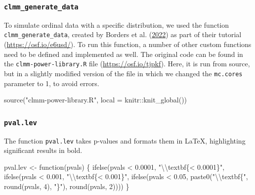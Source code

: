 \documentclass[
  bookmarksnumbered]{article}
\newenvironment{Shaded}{\begin{snugshade}}{\end{snugshade}}
\newcommand{\AttributeTok}[1]{\textcolor[rgb]{0.80,0.80,0.80}{#1}}
\newcommand{\ControlFlowTok}[1]{\textcolor[rgb]{0.94,0.87,0.69}{#1}}
\newcommand{\DecValTok}[1]{\textcolor[rgb]{0.86,0.86,0.80}{#1}}
\newcommand{\FloatTok}[1]{\textcolor[rgb]{0.75,0.75,0.82}{#1}}
\newcommand{\FunctionTok}[1]{\textcolor[rgb]{0.94,0.94,0.56}{#1}}
\newcommand{\NormalTok}[1]{\textcolor[rgb]{0.80,0.80,0.80}{#1}}
\newcommand{\OtherTok}[1]{\textcolor[rgb]{0.94,0.94,0.56}{#1}}
\newcommand{\SpecialCharTok}[1]{\textcolor[rgb]{0.86,0.64,0.64}{#1}}
\newcommand{\StringTok}[1]{\textcolor[rgb]{0.80,0.58,0.58}{#1}}
\begin{document}
\hypertarget{clmm_generate_data}{%
\subsubsection{\texorpdfstring{\texttt{clmm\_generate\_data}}{clmm\_generate\_data}}\label{clmm_generate_data}}

To simulate ordinal data with a specific distribution, we used the function \texttt{clmm\_generate\_data}, created by Borders et al. (\protect\hyperlink{ref-bordersPowerAnalysisOrdinal2022}{2022}) as part of their tutorial (\url{https://osf.io/e6usd/}). To run this function, a number of other custom functions need to be defined and implemented as well. The original code can be found in the \texttt{clmm-power-library.R} file (\url{https://osf.io/tjpkf}). Here, it is run from source, but in a slightly modified version of the file in which we changed the \texttt{mc.cores} parameter to 1, to avoid errors.

\begin{Shaded}
\begin{Highlighting}[]
\FunctionTok{source}\NormalTok{(}\StringTok{"clmm{-}power{-}library.R"}\NormalTok{, }\AttributeTok{local =}\NormalTok{ knitr}\SpecialCharTok{::}\FunctionTok{knit\_global}\NormalTok{())}
\end{Highlighting}
\end{Shaded}

\hypertarget{pval.lev}{%
\subsubsection{\texorpdfstring{\texttt{pval.lev}}{pval.lev}}\label{pval.lev}}

The function \texttt{pval.lev} takes p-values and formats them in \LaTeX, highlighting significant results in bold.

\begin{Shaded}
\begin{Highlighting}[]
\NormalTok{pval.lev }\OtherTok{\textless{}{-}} \ControlFlowTok{function}\NormalTok{(pvals) \{}
  \FunctionTok{ifelse}\NormalTok{(pvals }\SpecialCharTok{\textless{}} \FloatTok{0.0001}\NormalTok{,}
         \StringTok{"}\SpecialCharTok{\textbackslash{}\textbackslash{}}\StringTok{textbf\{\textless{} 0.0001\}"}\NormalTok{,}
         \FunctionTok{ifelse}\NormalTok{(pvals }\SpecialCharTok{\textless{}} \FloatTok{0.001}\NormalTok{,}
                \StringTok{"}\SpecialCharTok{\textbackslash{}\textbackslash{}}\StringTok{textbf\{\textless{} 0.001\}"}\NormalTok{,}
                \FunctionTok{ifelse}\NormalTok{(pvals }\SpecialCharTok{\textless{}} \FloatTok{0.05}\NormalTok{,}
                       \FunctionTok{paste0}\NormalTok{(}\StringTok{"}\SpecialCharTok{\textbackslash{}\textbackslash{}}\StringTok{textbf\{"}\NormalTok{, }\FunctionTok{round}\NormalTok{(pvals, }\DecValTok{4}\NormalTok{), }\StringTok{"\}"}\NormalTok{),}
                       \FunctionTok{round}\NormalTok{(pvals, }\DecValTok{2}\NormalTok{))))}
\NormalTok{\}}
\end{Highlighting}
\end{Shaded}
\end{document}
